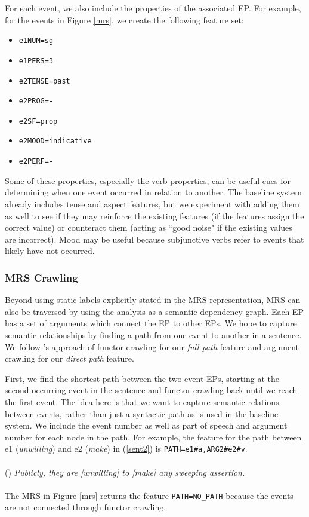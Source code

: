 \documentclass[11pt]{article}
\begin{document}
For each event, we also include the properties of the associated EP. For example, for the events in Figure \ref{mrs}, we create the following feature set:

\begin{itemize}
\setlength\itemsep{-0.5em}
\item \texttt{e1NUM=sg}
\item \texttt{e1PERS=3}
\item \texttt{e2TENSE=past}
\item \texttt{e2PROG=-}
\item \texttt{e2SF=prop}
\item \texttt{e2MOOD=indicative}
\item \texttt{e2PERF=-}
\end{itemize}

Some of these properties, especially the verb properties, can be useful cues for determining when one event occurred in relation to another. The baseline system already includes tense and aspect features, but we experiment with adding them as well to see if they may reinforce the existing features (if the features assign the correct value) or counteract them (acting as ``good noise" if the existing values are incorrect). Mood may be useful because subjunctive verbs refer to events that likely have not occurred.

\subsubsection{MRS Crawling}

Beyond using static labels explicitly stated in the MRS representation, MRS can also be traversed by using the analysis as a semantic dependency graph. Each EP has a set of arguments which connect the EP to other EPs. We hope to capture semantic relationships by finding a path from one event to another in a sentence. We follow 's approach of functor crawling for our \emph{full path} feature and argument crawling for our \emph{direct path} feature.

First, we find the shortest path between the two event EPs, starting at the second-occurring event in the sentence and functor crawling back until we reach the first event. The idea here is that we want to capture semantic relations between events, rather than just a syntactic path as is used in the baseline system. We include the event number as well as part of speech and argument number for each node in the path. For example, the feature for the path between e1 (\emph{unwilling}) and e2 (\emph{make}) in (\ref{sent2}) is \texttt{PATH=e1\#a,ARG2\#e2\#v}.\\\\
(\exampleno)\label{sent2} \emph{Publicly, they are [unwilling] to [make] any sweeping assertion.}\\\\
The MRS in Figure \ref{mrs} returns the feature \texttt{PATH=NO\_PATH} because the events are not connected through functor crawling.
\end{document}
